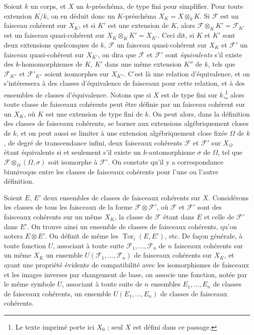 Soient $k$ un corps, et $X$ un $k$-préschéma, de type fini pour simplifier.
Pour toute extension $K/k$, on en déduit donc un $K$-préschéma
$X_K=X\otimes_k K$. Si $\mathcal F$ est un faisceau cohérent sur $X_K$, et si
$K'$ est une extension de $K$, alors
$\mathcal F\otimes_K K'=\mathcal F_{K'}$ est un faisceau quasi-cohérent sur
$X_K\otimes_K K'=X_{K'}$. Ceci dit, si $K$ et $K'$ sont deux extensions
quelconques de $k$, $\mathcal F$ un faisceau quasi-cohérent sur $X_K$ et
$\mathcal F'$
un faisceau quasi-cohérent sur $X_{K'}$, on dira que $\mathcal F$ et
$\mathcal F'$ sont \emph{équivalents} s'il existe des $k$-homomorphismes de
$K$, $K'$ dans une même extension $K''$ de $k$, tels que
$\mathcal F_{K''}$ et $\mathcal F'_{K''}$ soient isomorphes sur $X_{K''}$.
C'est là une relation d'équivalence, et on s'intéressera à des classes
d'équivalence de faisceaux pour cette relation, et à des ensembles de classes
d'équivalence. Notons que si $X$ est de type fini sur
$k$,\footnote{Le texte imprimé porte ici $X_0$ ; seul $X$ est défini dans ce
passage.} alors toute classe de faisceaux cohérents peut être définie par un
faisceau cohérent sur un $X_K$, où $K$ est une extension de type fini de $k$.
On peut alors, dans la définition des classes de faisceaux cohérents, se borner
aux extensions algébriquement closes de $k$, et on peut aussi se limiter à une
extension algébriquement close fixée $\Omega$ de $k$, de degré de
transcendance infini, deux faisceaux cohérents $\mathcal F$ et $\mathcal F'$
sur $X_\Omega$ étant équivalents si et seulement s'il existe un
$k$-automorphisme $\sigma$ de $\Omega$, tel que
$\mathcal F\otimes_\Omega(\Omega,\sigma)$ soit isomorphe à $\mathcal F'$.
On constate qu'il y a correspondance biunivoque entre les classes de faisceaux
cohérents pour l'une ou l'autre définition.

Soient $E$, $E'$ deux ensembles de classes de faisceaux cohérents sur $X$.
Considérons les classes de tous les faisceaux de la forme
$\mathcal F\otimes\mathcal F'$, où $\mathcal F$ et $\mathcal F'$ sont des
faisceaux cohérents sur un même $X_K$, la classe de $\mathcal F$ étant dans
$E$ et celle de $\mathcal F'$ dans $E'$. On trouve ainsi un ensemble de
classes de faisceaux cohérents, qu'on notera $E\otimes E'$. On définit de même
les $\operatorname{Tor}_i(E,E')$, etc. De façon générale, à toute fonction
$U$, associant à toute suite $\mathcal F_1,\ldots,\mathcal F_n$ de $n$
faisceaux cohérents sur un même $X_K$ un ensemble
$U(\mathcal F_1,\ldots,\mathcal F_n)$ de faisceaux cohérents sur $X_K$, et
ayant une propriété évidente de compatibilité avec les isomorphismes de
faisceaux et les images inverses par changement de base, on associe une
fonction, notée par le même symbole $U$, associant à toute suite de $n$
ensembles $E_1,\ldots,E_n$ de classes de faisceaux cohérents, un ensemble
$U(E_1,\ldots,E_n)$ de classes de faisceaux cohérents.

